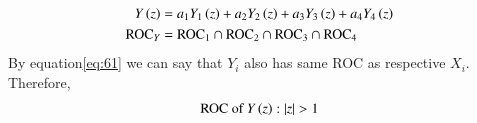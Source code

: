 \documentclass[journal,12pt,twocolumn]{IEEEtran}
\theoremstyle{remark}
\begin{document}
\begin{enumerate}
\begin{align}
    Y\left(z\right) &= a_1 Y_1\left(z\right) + a_2 Y_2\left(z\right) + a_3 Y_3\left(z\right) + a_4 Y_4\left(z\right) \label{eq:linear_combination_Y} \\
    \text{ROC}_{Y} &= \text{ROC}_{1} \cap \text{ROC}_{2} \cap \text{ROC}_{3} \cap \text{ROC}_{4} \label{eq:roc_Y}
\end{align}
By equation\eqref{eq:61} we can say that $Y_i$ also has same ROC as respective $X_i$. Therefore,\\
\begin{align}
    \text{ROC of $Y\brak{z}$} : |z|>1
\end{align}

\end{enumerate}
\end{document}

